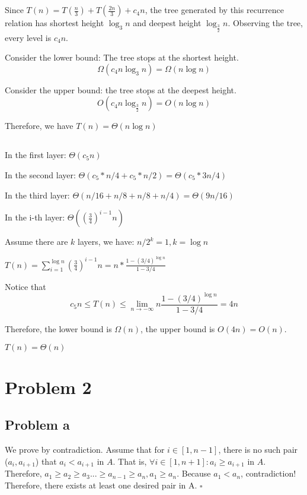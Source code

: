 \documentclass{article}
\begin{document}
\subsection{}

Since $T(n) = T(\frac{n}{3}) + T(\frac{2n}{3}) +c_4n$, the tree generated by this recurrence relation has shortest height $\log_3{n}$ and deepest height $\log_{\frac{3}{2}}{n}$. Observing the tree, every level is $c_4n$.

Consider the lower bound: The tree stops at the shortest height. 
\[\Omega(c_4n\log_3{n})=\Omega(n\log{n})\]

Consider the upper bound: the tree stops at the deepest height.
\[O(c_4n\log_{\frac{3}{2}}{n}) = O(n\log{n})\]

Therefore, we have $T(n) =\Theta(n\log{n})$

\subsection{}
In the first layer: $\Theta(c_5n)$

In the second layer: $\Theta(c_5*n/4+c_5*n/2) = \Theta(c_5*3n/4)$

In the third layer: $\Theta(n/16+n/8+n/8+n/4)=\Theta(9n/16)$

In the i-th layer:
$\Theta((\frac{3}{4})^{i-1}n)$

Assume there are $k$ layers, we have: $n/{2^k}=1, k = \log{n}$

$T(n)=\sum_{i=1}^{\log{n}}(\frac{3}{4})^{i-1}n=n*\frac{1-(3/4)^{\log{n}}}{1-3/4}$

Notice that \[c_5n \leq T(n) \leq \lim_{n \to -\infty}n\frac{1-(3/4)^{\log{n}}}{1-3/4}=4n\]

Therefore, the lower bound is $\Omega(n)$, the upper bound is $O(4n)=O(n)$.

$T(n) = \Theta(n)$

\section{Problem 2}
\subsection{Problem a}
We prove by contradiction. Assume that for $i\in [1,n-1]$, there is no such pair ($a_i, a_{i+1}$) that $a_i < a_{i+1}$ in $A$. That is, $\forall i\in[1,n+1]: a_i \geq a_{i+1}$ in $A$. Therefore, $a_1 \geq a_2 \geq a_3 ... \geq a_{n-1} \geq a_{n}, a_1 \geq a_n$. Because $a_1 < a_n$, contradiction! Therefore, there exists at least one desired pair in A. $\square$
\end{document}
